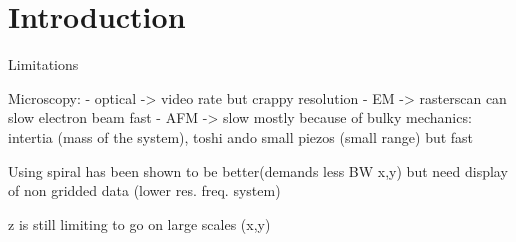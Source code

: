 \chapter{Introduction}

Limitations

Microscopy:
	- optical -> video rate but crappy resolution
	- EM -> rasterscan can slow electron beam fast
	- AFM -> slow mostly because of bulky mechanics: intertia (mass of the system), toshi ando small piezos (small range) but fast

Using spiral has been shown to be better(demands less BW x,y) but need display of non gridded data (lower res. freq. system)

z is still limiting to go on large scales (x,y)